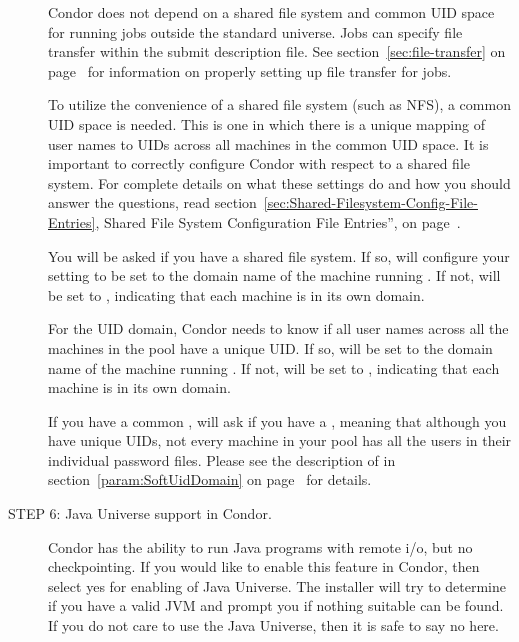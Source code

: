 \begin{description}
     Condor does not depend on a shared file system and common UID
     space for running jobs outside the standard universe.
     Jobs can specify file transfer within the submit description file.
     See
     section~\ref{sec:file-transfer} on page~\pageref{sec:file-transfer}
     for information on properly setting up file transfer for jobs.

     To utilize the convenience of a shared file system (such as NFS),
     a common UID space is needed.  
     This is one in which there is a unique mapping of user names to
     UIDs across all machines in the common UID space.
     It is important to correctly configure
     Condor with respect to a shared file system.
     For complete details on what these settings do and how you
     should answer the questions, read
     section~\ref{sec:Shared-Filesystem-Config-File-Entries},
     Shared File System Configuration File Entries'', on
     page~\pageref{sec:Shared-Filesystem-Config-File-Entries}.

     You will be asked if you have a shared file system.  If so,
      will configure your  
     setting to be set to the domain name of the machine running
     .
     If not,  will be set to
     , indicating that each machine is in its
     own domain.

     For the UID domain, Condor needs to know if all user names across all
     the machines in the pool have a unique UID.  
     If so,  will be set to the domain name of the
     machine running . 
     If not,  will be set to
     , indicating that each machine is in its 
     own domain.

     If you have a common ,  will
     ask if you have a , meaning that although
     you have unique UIDs, not every machine in your pool has all the
     users in their individual password files.  Please see the
     description of  in
     section~\ref{param:SoftUidDomain} on
     page~\pageref{param:SoftUidDomain} for details.  

\item[STEP 6: Java Universe support in Condor.]

	Condor has the ability to run Java programs with remote i/o,
	but no checkpointing. If you would like to enable this feature
	in Condor, then select yes for enabling of Java Universe. The
	installer will try to determine if you have a valid JVM and
	prompt you if nothing suitable can be found. If you do not care
	to use the Java Universe, then it is safe to say no here.


\end{description}
